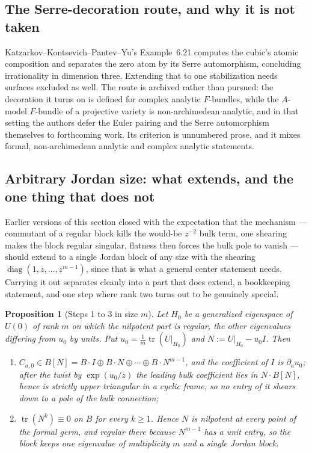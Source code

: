 \documentclass[11pt]{article}
\newtheorem{proposition}[theorem]{Proposition}
\theoremstyle{definition}
\theoremstyle{remark}
\begin{document}
\subsection*{The Serre-decoration route, and why it is not taken}

Katzarkov--Kontsevich--Pantev--Yu's Example~6.21 computes the cubic's
atomic composition and separates the zero atom by its Serre
automorphism, concluding irrationality in dimension three.  Extending
that to one stabilization needs surfaces excluded as well.  The route is
archived rather than pursued: the decoration it turns on is defined for
complex analytic $F$-bundles, while the $A$-model $F$-bundle of a
projective variety is non-archimedean analytic, and in that setting the
authors defer the Euler pairing and the Serre automorphism themselves to
forthcoming work.  Its criterion is unnumbered prose, and it mixes
formal, non-archimedean analytic and complex analytic statements.

\subsection*{Arbitrary Jordan size: what extends, and the one thing that does
not}
\label{sec:jordan-size}

Earlier versions of this section closed with the expectation that the mechanism
--- commutant of a regular block kills the would-be $z^{-2}$ bulk term, one
shearing makes the block regular singular, flatness then forces the bulk pole to
vanish --- should extend to a single Jordan block of any size with the shearing
$\operatorname{diag}(1,z,\dots,z^{m-1})$, since that is what a general center
statement needs. Carrying it out separates cleanly into a part that does extend,
a bookkeeping statement, and one step where rank two turns out to be genuinely
special.

\begin{proposition}[Steps 1 to 3 in size $m$]
\label{prop:size-m-steps}
Let $H_0$ be a generalized eigenspace of $U(0)$ of rank $m$ on which the
nilpotent part is regular, the other eigenvalues differing from $u_0$ by units.
Put $u_0=\tfrac1m\operatorname{tr}(U|_{H_0})$ and $N:=U|_{H_0}-u_0I$. Then
\begin{enumerate}
\item $C_{a,0}\in B[N]=B\cdot I\oplus B\cdot N\oplus\cdots\oplus B\cdot N^{m-1}$,
  and the coefficient of $I$ is $\partial_au_0$; after the twist by
  $\exp(u_0/z)$ the leading bulk coefficient lies in $N\cdot B[N]$, hence is
  strictly upper triangular in a cyclic frame, so no entry of it shears down to
  a pole of the bulk connection;
\item $\operatorname{tr}(N^k)\equiv0$ on $B$ for every $k\ge1$. Hence $N$ is
  nilpotent at every point of the formal germ, and regular there because
  $N^{m-1}$ has a unit entry, so the block keeps one eigenvalue of multiplicity
  $m$ and a single Jordan block.
\end{enumerate}
\end{proposition}
\end{document}
